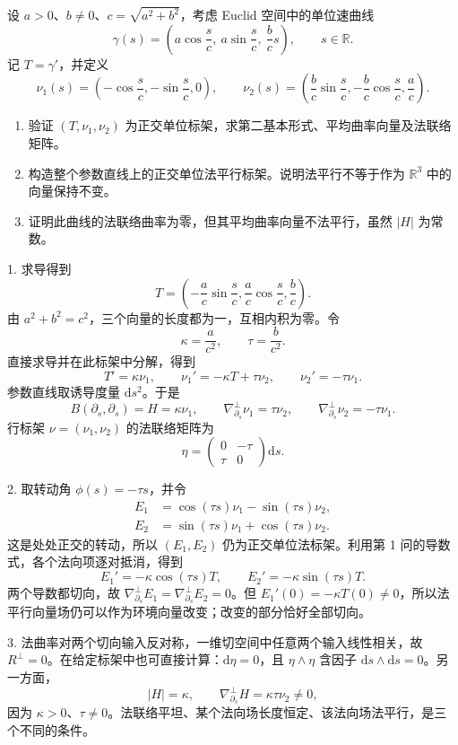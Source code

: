 \begin{exercise}\label{g3:ex:helix-normal-parallel-frame}
	设 \(a>0\)、\(b\ne0\)、\(c=\sqrt{a^2+b^2}\)，考虑 Euclid 空间中的单位速曲线
	\[
		\gamma(s)=\left(a\cos\frac sc,\ a\sin\frac sc,\ \frac bc s\right),
		\qquad s\in\mathbb R.
	\]
	记 \(T=\gamma'\)，并定义
	\[
		\nu_1(s)=\left(-\cos\frac sc,-\sin\frac sc,0\right),\qquad
		\nu_2(s)=\left(\frac bc\sin\frac sc,-\frac bc\cos\frac sc,\frac ac\right).
	\]
	\begin{enumerate}
		\item 验证 \((T,\nu_1,\nu_2)\) 为正交单位标架，求第二基本形式、平均曲率向量及法联络矩阵。
		\item 构造整个参数直线上的正交单位法平行标架。说明法平行不等于作为 \(\mathbb R^3\) 中的向量保持不变。
		\item 证明此曲线的法联络曲率为零，但其平均曲率向量不法平行，虽然 \(|H|\) 为常数。
	\end{enumerate}
\end{exercise}
\begin{solution}
	1. 求导得到
	\[
		T=\left(-\frac ac\sin\frac sc,\frac ac\cos\frac sc,\frac bc\right).
	\]
	由 \(a^2+b^2=c^2\)，三个向量的长度都为一，互相内积为零。令
	\[
		\kappa=\frac a{c^2},\qquad \tau=\frac b{c^2}.
	\]
	直接求导并在此标架中分解，得到
	\[
		T'=\kappa\nu_1,\qquad
		\nu_1'=-\kappa T+\tau\nu_2,\qquad
		\nu_2'=-\tau\nu_1.
	\]
	参数直线取诱导度量 \(\mathrm ds^2\)。于是
	\[
		B(\partial_s,\partial_s)=H=\kappa\nu_1,\qquad
		\nabla^\perp_{\partial_s}\nu_1=\tau\nu_2,\qquad
		\nabla^\perp_{\partial_s}\nu_2=-\tau\nu_1.
	\]
	行标架 \(\nu=(\nu_1,\nu_2)\) 的法联络矩阵为
	\[
		\eta=\begin{pmatrix}0&-\tau\\\tau&0\end{pmatrix}\mathrm ds.
	\]

	2. 取转动角 \(\phi(s)=-\tau s\)，并令
	\[
		\begin{aligned}
			E_1&=\cos(\tau s)\nu_1-\sin(\tau s)\nu_2,\\
			E_2&=\sin(\tau s)\nu_1+\cos(\tau s)\nu_2.
		\end{aligned}
	\]
	这是处处正交的转动，所以 \((E_1,E_2)\) 仍为正交单位法标架。利用第 1 问的导数式，各个法向项逐对抵消，得到
	\[
		E_1'=-\kappa\cos(\tau s)T,\qquad
		E_2'=-\kappa\sin(\tau s)T.
	\]
	两个导数都切向，故 \(\nabla^\perp_{\partial_s}E_1=
	\nabla^\perp_{\partial_s}E_2=0\)。但 \(E_1'(0)=-\kappa T(0)\ne0\)，所以法平行向量场仍可以作为环境向量改变；改变的部分恰好全部切向。

	3. 法曲率对两个切向输入反对称，一维切空间中任意两个输入线性相关，故 \(R^\perp=0\)。在给定标架中也可直接计算：\(\mathrm d\eta=0\)，且 \(\eta\wedge\eta\) 含因子 \(\mathrm ds\wedge\mathrm ds=0\)。另一方面，
	\[
		|H|=\kappa,\qquad
		\nabla^\perp_{\partial_s}H
		=\kappa\tau\nu_2\ne0,
	\]
	因为 \(\kappa>0\)、\(\tau\ne0\)。法联络平坦、某个法向场长度恒定、该法向场法平行，是三个不同的条件。
\end{solution}

